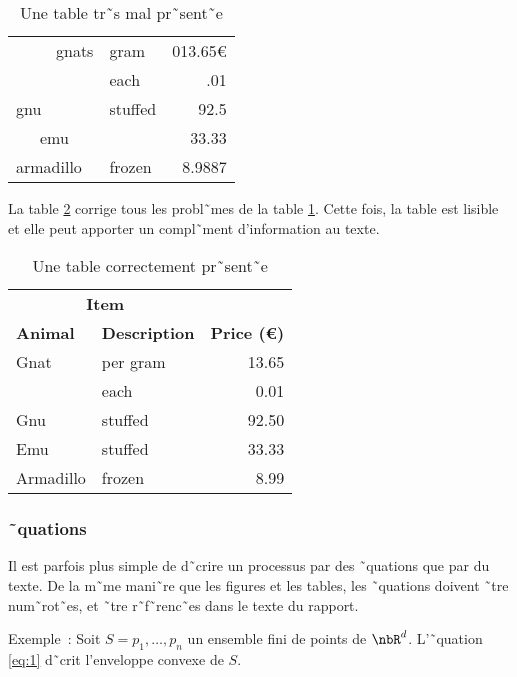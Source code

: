 \begin{table}[htbp]
  \centering
\begin{tabular}{||l|lr||} 
\hline
\hline
~~~~~gnats     & gram      & 013.65\euro \\ \cline{2-3}
          & each      & .01 \\ \hline
gnu       & stuffed   & 92.5 \\ \cline{1-1} \cline{3-3}
~~~emu       &           & 33.33 \\ \hline
armadillo & frozen    & 8.9887 \\ \hline
\end{tabular}
  \caption{Une table tr˜s mal pr˜sent˜e}
  \label{tab:tab1}
\end{table}

La table \ref{tab:tab2} corrige tous les probl˜mes de la table
\ref{tab:tab1}. Cette fois, la table est lisible et elle peut apporter un
compl˜ment d'information au texte.

\begin{table}[htbp]
  \centering
\begin{tabular}{@{}llr@{}} 
  \toprule
  \multicolumn{2}{c}{\textbf{Item}} \\ 
  \cmidrule(r){1-2}
  \textbf{Animal} & \textbf{Description} & \textbf{Price (\euro)}\\ 
  \midrule
  Gnat  & per gram  & 13.65 \\
           & each      & 0.01 \\
      Gnu   & stuffed   & 92.50 \\
      Emu   & stuffed   & 33.33 \\
      Armadillo & frozen & 8.99 \\ 
      \bottomrule
\end{tabular}
  \caption{Une table correctement pr˜sent˜e}
  \label{tab:tab2}
\end{table}

\subsubsection{˜quations}

Il est parfois plus simple de d˜crire un processus par des ˜quations que par
du texte. 
De la m˜me mani˜re que les figures et les tables, les ˜quations
doivent ˜tre num˜rot˜es, et ˜tre r˜f˜renc˜es dans le texte du
rapport. 

Exemple~: Soit $S={p_1,\ldots,p_n}$ un ensemble fini de points de
$\nbR^d$. L'˜quation \eqref{eq:1} d˜crit l'enveloppe convexe de $S$.

